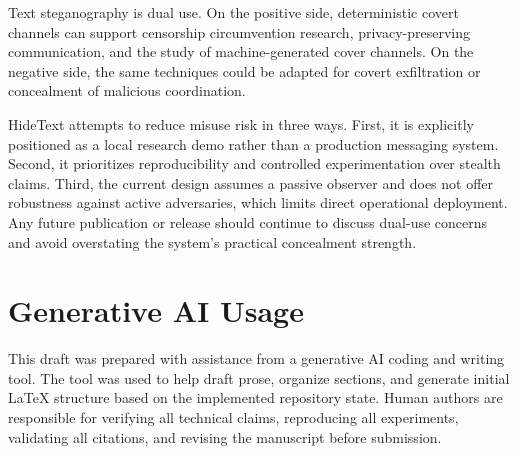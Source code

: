 \documentclass[sigconf,review,anonymous]{acmart}
\begin{document}
Text steganography is dual use. On the positive side, deterministic covert channels can support censorship circumvention research, privacy-preserving communication, and the study of machine-generated cover channels. On the negative side, the same techniques could be adapted for covert exfiltration or concealment of malicious coordination.

HideText attempts to reduce misuse risk in three ways. First, it is explicitly positioned as a local research demo rather than a production messaging system. Second, it prioritizes reproducibility and controlled experimentation over stealth claims. Third, the current design assumes a passive observer and does not offer robustness against active adversaries, which limits direct operational deployment. Any future publication or release should continue to discuss dual-use concerns and avoid overstating the system's practical concealment strength.

\section{Generative AI Usage}

This draft was prepared with assistance from a generative AI coding and writing tool. The tool was used to help draft prose, organize sections, and generate initial \LaTeX{} structure based on the implemented repository state. Human authors are responsible for verifying all technical claims, reproducing all experiments, validating all citations, and revising the manuscript before submission.
\end{document}
